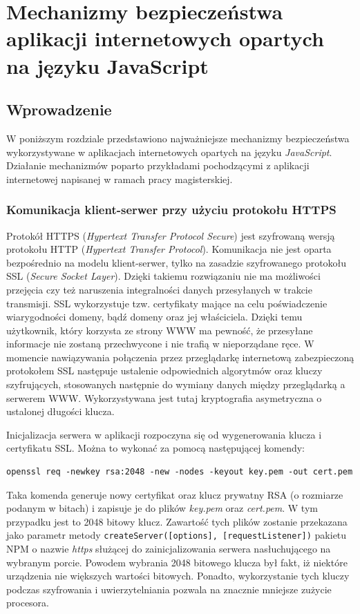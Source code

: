 \chapter{Mechanizmy bezpieczeństwa aplikacji internetowych opartych na języku JavaScript}

\section{Wprowadzenie}
W poniższym rozdziale przedstawiono najważniejsze mechanizmy bezpieczeństwa wykorzystywane w aplikacjach internetowych opartych na języku \textit{JavaScript}. Działanie mechanizmów poparto przykładami pochodzącymi z aplikacji internetowej napisanej w ramach pracy magisterskiej. 

\subsection{Komunikacja klient-serwer przy użyciu protokołu HTTPS}
Protokół HTTPS (\textit{Hypertext Transfer Protocol Secure}) jest szyfrowaną wersją protokołu HTTP (\textit{Hypertext Transfer Protocol}). Komunikacja nie jest oparta bezpośrednio na modelu klient-serwer, tylko na zasadzie szyfrowanego protokołu SSL (\textit{Secure Socket Layer}). Dzięki takiemu rozwiązaniu nie ma możliwości przejęcia czy też naruszenia integralności danych przesyłanych w trakcie transmisji. SSL wykorzystuje tzw. certyfikaty mające na celu poświadczenie wiarygodności domeny, bądź domeny oraz jej właściciela. Dzięki temu użytkownik, który korzysta ze strony WWW ma pewność, że przesyłane informacje nie zostaną przechwycone i nie trafią w nieporządane ręce. W momencie nawiązywania połączenia przez przeglądarkę internetową zabezpieczoną protokołem SSL następuje ustalenie odpowiednich algorytmów oraz kluczy szyfrujących, stosowanych następnie do wymiany danych między przeglądarką a serwerem WWW. Wykorzystywana jest tutaj kryptografia asymetryczna o ustalonej długości klucza.

Inicjalizacja serwera w aplikacji rozpoczyna się od wygenerowania klucza i certyfikatu SSL. Można to wykonać za pomocą następującej komendy:

\begin{verbatim}
openssl req -newkey rsa:2048 -new -nodes -keyout key.pem -out cert.pem
\end{verbatim}

Taka komenda generuje nowy certyfikat oraz klucz prywatny RSA (o rozmiarze podanym w bitach) i zapisuje je do plików \textit{key.pem} oraz \textit{cert.pem}. W tym przypadku jest to 2048 bitowy klucz. Zawartość tych plików zostanie przekazana jako parametr metody \texttt{createServer([options], [requestListener])} pakietu NPM o nazwie \textit{https} służącej do zainicjalizowania serwera nasłuchującego na wybranym porcie. Powodem wybrania 2048 bitowego klucza był fakt, iż niektóre urządzenia nie większych wartości bitowych. Ponadto, wykorzystanie tych kluczy podczas szyfrowania i uwierzytelniania pozwala na znacznie mniejsze zużycie procesora.

